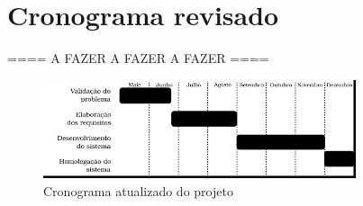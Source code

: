 \section{Cronograma revisado}


==== A FAZER A FAZER A FAZER  ====


\begin{figure}[ht]
    \begin{center}
    \includegraphics[width=260pt]{figuras/cronograma-atualizado}
    \caption{Cronograma atualizado do projeto}
    \label{fig:cronograma-atualizado}
    \end{center}
\end{figure}

